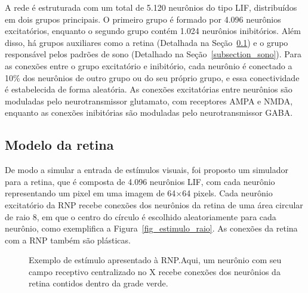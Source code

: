 A rede é estruturada com um total de 5.120 neurônios do tipo LIF, distribuídos em dois grupos principais. O primeiro grupo é
formado por 4.096 neurônios excitatórios, enquanto o segundo grupo contém 1.024 neurônios inibitórios. Além disso, há grupos
auxiliares como a retina (Detalhada na Seção~\ref{subsection_retina}) e o grupo responsável pelos padrões de sono (Detalhado na
Seção~\ref{subsection_sono}). Para as conexões entre o grupo excitatório e inibitório, cada neurônio é conectado a 10\% dos
neurônios de outro grupo ou do seu próprio grupo, e essa conectividade é estabelecida de forma aleatória. As conexões excitatórias
entre neurônios são moduladas pelo neurotransmissor glutamato, com receptores AMPA e NMDA, enquanto as conexões inibitórias são
moduladas pelo neurotransmissor GABA.\@

\subsection{Modelo da retina}\label{subsection_retina}

De modo a simular a entrada de estímulos visuais, foi proposto um simulador para a retina, que é composta de 4.096 neurônios LIF,
com cada neurônio representando um pixel em uma imagem de 64$\times$64 pixels. Cada neurônio excitatório da RNP recebe conexões
dos neurônios da retina de uma área circular de raio 8, em que o centro do círculo é escolhido aleatoriamente para cada neurônio,
como exemplifica a Figura~\ref{fig_estimulo_raio}. As conexões da retina com a RNP também são plásticas.

\begin{figure}[!ht]
\caption{Exemplo de estímulo apresentado à RNP.\@ Aqui, um neurônio com seu campo receptivo centralizado no X recebe conexões dos neurônios da retina contidos dentro da grade verde.}
\end{figure}

